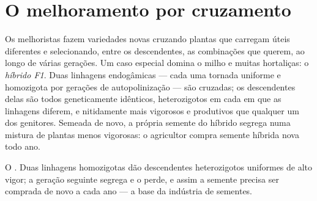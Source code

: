 \section{O melhoramento por cruzamento}

\begin{proposition}\label{prop:g12:domesticated-plants:hybrids}
Os melhoristas fazem variedades novas cruzando plantas que carregam
 úteis diferentes e selecionando, entre os descendentes, as
combinações que querem, ao longo de várias gerações. Um caso especial
domina o milho e muitas hortaliças: o \emph{híbrido F1}. Duas linhagens endogâmicas --- cada uma tornada uniforme e
homozigota por gerações de autopolinização --- são cruzadas; os
descendentes delas são todos geneticamente idênticos, heterozigotos em
cada  em que as linhagens diferem, e nitidamente mais vigorosos e
produtivos que qualquer um dos genitores. Semeada de novo, a própria
semente do híbrido segrega numa mistura de plantas menos vigorosas: o
agricultor compra semente híbrida nova todo ano.
\end{proposition}
\admitted

\begin{omfigure}

{\small O . Duas linhagens homozigotas dão descendentes
heterozigotos uniformes de alto vigor; a geração seguinte segrega e o
perde, e assim a semente precisa ser comprada de novo a cada ano --- a
base da indústria de sementes.}
\end{omfigure}

